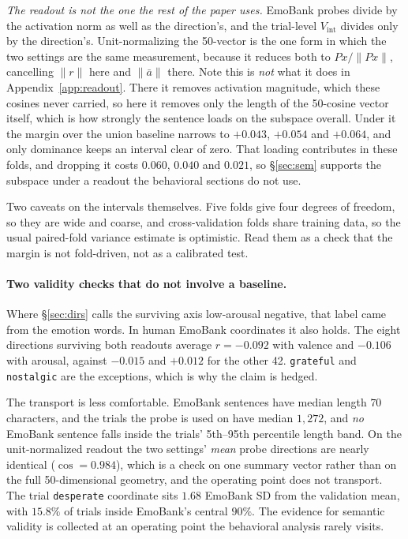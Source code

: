 \emph{The readout is not the one the rest of the paper uses.} EmoBank probes divide
by the activation norm as well as the direction's, and the trial-level $V_{\text{int}}$
divides only by the direction's. Unit-normalizing the 50-vector is the one form in which the two settings are the
same measurement, because it reduces both to $P x / \lVert P x \rVert$, cancelling
$\lVert r \rVert$ here and $\lVert \bar a \rVert$ there. Note this is \emph{not}
what it does in Appendix~\ref{app:readout}. There it removes activation magnitude,
which these cosines never carried, so here it removes only the length of the
50-cosine vector itself, which is how strongly the sentence loads on the subspace overall.
Under it the margin over the union baseline narrows to $+0.043$, $+0.054$ and
$+0.064$, and only dominance keeps an interval clear of zero. That loading
contributes in these folds, and dropping it costs $0.060$, $0.040$ and $0.021$,
so \S\ref{sec:sem} supports the subspace under a readout the behavioral sections do
not use.

Two caveats on the intervals themselves. Five folds give four degrees of freedom,
so they are wide and coarse, and cross-validation folds share training data, so the
usual paired-fold variance estimate is optimistic. Read them as a check that the
margin is not fold-driven, not as a calibrated test.

\paragraph{Two validity checks that do not involve a baseline.} Where
\S\ref{sec:dirs} calls the surviving axis low-arousal negative, that label came
from the emotion words. In human EmoBank coordinates it also holds. The eight
directions surviving both readouts average $r = -0.092$ with valence and $-0.106$
with arousal, against $-0.015$ and $+0.012$ for the other 42. \texttt{grateful} and
\texttt{nostalgic} are the exceptions, which is why the claim is hedged.

The transport is less comfortable. EmoBank sentences have median length $70$
characters, and the trials the probe is used on have median $1{,}272$, and \emph{no}
EmoBank sentence falls inside the trials' 5th--95th percentile length band. On the
unit-normalized readout the two settings' \emph{mean} probe directions are nearly
identical ($\cos = 0.984$), which is a check on one summary vector rather than on
the full 50-dimensional geometry, and the operating point does not transport. The trial \texttt{desperate} coordinate sits $1.68$ EmoBank SD from the
validation mean, with $15.8\%$ of trials inside EmoBank's central $90\%$. The evidence for semantic
validity is collected at an operating point the behavioral analysis rarely visits.

